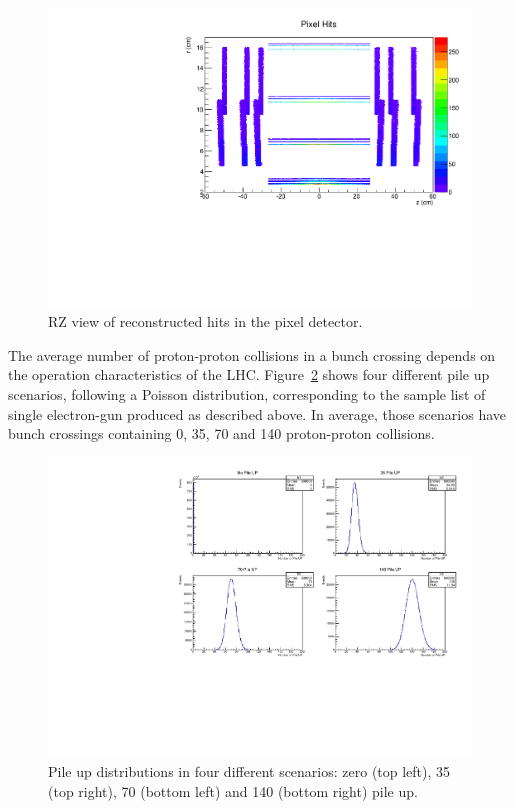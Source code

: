 \begin{figure}[!htb]
  \centering
  \includegraphics[scale=0.8]{../SimulationTools/RZ_view_pixel_hits_v2.pdf}
  \caption{RZ view of reconstructed hits in the pixel detector.}
  \label{fig:RZ_view_pixel_hits}
\end{figure}

The average number of proton-proton collisions in a bunch crossing depends on the operation characteristics of
the LHC. Figure~\ref{fig:PileUP_4scenarios} shows four different pile up scenarios, following a Poisson
distribution, corresponding to the sample list of single electron-gun produced as described above. In average,
those scenarios have bunch crossings containing 0, 35, 70 and 140 proton-proton collisions.

\begin{figure}[!htb]
  \centering
  \includegraphics[scale=0.8]{../SimulationTools/PileUP_4scenarios.pdf}
  \caption{Pile up distributions in four different scenarios: zero (top left), 35 (top right), 70 (bottom
    left) and 140 (bottom right) pile up.}
  \label{fig:PileUP_4scenarios}
\end{figure}

